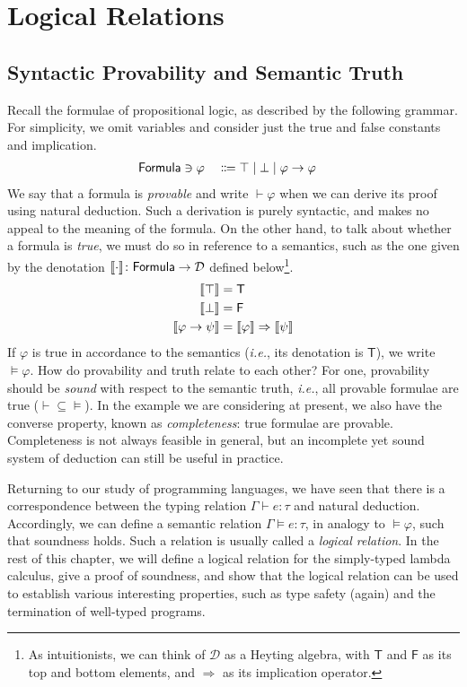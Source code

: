 \chapter{Logical Relations}

\section{Syntactic Provability and Semantic Truth}

Recall the formulae of propositional logic, as described by the following
grammar. For simplicity, we omit variables and consider just the true
and false constants and implication.
\begin{alignat*}{2}
  \mathsf{Formula} & \ni \varphi && \Coloneqq
    \top \mid \bot \mid \varphi \to \varphi
\end{alignat*}
We say that a formula is \emph{provable} and write $\vdash \varphi$
when we can derive its proof using natural deduction. Such a derivation
is purely syntactic, and makes no appeal to the meaning of the formula.
On the other hand, to talk about whether a formula is \emph{true},
we must do so in reference to a semantics, such as the one given by the
denotation
$\llbracket\cdot\rrbracket \colon \mathsf{Formula} \to \mathcal{D}$
defined below\footnote{
  As intuitionists, we can think of $\mathcal{D}$ as a Heyting algebra,
  with $\mathsf{T}$ and $\mathsf{F}$ as its top and bottom elements, and
  $\Rightarrow$ as its implication operator.
}.
\begin{alignat*}{2}
  \llbracket\top\rrbracket & = \mathsf{T} \\
  \llbracket\bot\rrbracket & = \mathsf{F} \\
  \llbracket\varphi \to \psi\rrbracket & = \llbracket\varphi\rrbracket \Rightarrow \llbracket\psi\rrbracket
\end{alignat*}
If $\varphi$ is true in accordance to the semantics
(\emph{i.e.}, its denotation is $\mathsf{T}$),
we write $\models \varphi$. How do
provability and truth relate to each other? For one, provability should be
\emph{sound} with respect to the semantic truth, \emph{i.e.}, all provable
formulae are true (${\vdash} \subseteq {\models}$).
In the example we are considering at present, we also have the
converse property, known as \emph{completeness}: true formulae are provable.
Completeness is not always feasible in general, but an incomplete
yet sound system of deduction can still be useful in practice.

Returning to our study of programming languages, we have seen that there is a
correspondence between the typing relation $\Gamma \vdash e : \tau$ and natural
deduction.
Accordingly, we can define a semantic relation $\Gamma \models e : \tau$, in
analogy to $\models \varphi$, such that soundness holds.
Such a relation is usually called a \emph{logical relation}. In the rest of
this chapter, we will define a logical relation for the simply-typed lambda
calculus, give a proof of soundness, and show that the logical relation can be
used to establish various interesting properties, such as type safety (again)
and the termination of well-typed programs.

